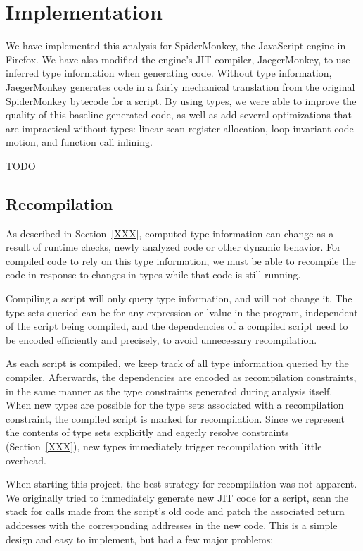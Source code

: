 
\section{Implementation}

We have implemented this analysis for SpiderMonkey, the JavaScript engine
in Firefox.
We have also modified the engine's JIT compiler, JaegerMonkey, to use
inferred type information when generating code.
Without type information, JaegerMonkey generates code in a fairly mechanical
translation from the original SpiderMonkey bytecode for a script.
By using types, we were able to improve the quality of this
baseline generated code, as well as add several optimizations that
are impractical without types: linear scan register allocation, loop invariant
code motion, and function call inlining.

TODO

\subsection{Recompilation}

As described in Section~\ref{XXX}, computed type information can change as
a result of runtime checks, newly analyzed code or other dynamic behavior.
For compiled code to rely on this type information, we must be able
to recompile the code in response to changes in types while that code is
still running.

Compiling a script will only query type information, and will not change it.
The type sets queried can be for any expression or lvalue in the program,
independent of the script being compiled,
and the dependencies of a compiled script need to be encoded efficiently
and precisely, to avoid unnecessary recompilation.

As each script is compiled, we keep track of all type information queried
by the compiler.
Afterwards, the dependencies are encoded as recompilation constraints,
in the same manner as the type constraints generated during analysis itself.
When new types are possible for the type sets associated with a recompilation
constraint, the compiled script is marked for recompilation.
Since we represent the contents of type sets explicitly and eagerly resolve
constraints (Section~\ref{XXX}), new types immediately
trigger recompilation with little overhead.

When starting this project, the best strategy for recompilation
was not apparent.
We originally tried to immediately generate new JIT code for a script,
scan the stack for calls made from the script's old code and patch the
associated return addresses with the corresponding addresses in the
new code.
This is a simple design and easy to implement, but had a few major problems:


